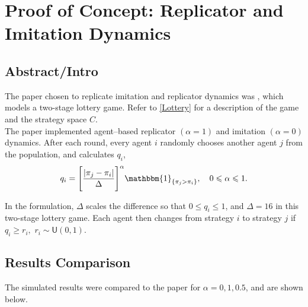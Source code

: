
\section{Proof of Concept: Replicator and Imitation Dynamics} \label{Lottery_Me}
\subsection{Abstract/Intro}
The paper chosen to replicate imitation and replicator dynamics was \cite{RN30}, which models a two-stage lottery game. Refer to \ref{Lottery} for a description of the game and the strategy space $C$. \\

The paper implemented agent--based replicator $(\alpha = 1)$ and imitation $(\alpha = 0)$ dynamics. After each round, every agent $i$ randomly chooses another agent $j$ from the population, and calculates $q_i$, \\

\begin{align} \label{rep}
q_i = \Bigg[ \frac{|\pi_j - \pi_i|}{\Delta} \Bigg]^\alpha \mathbbm{1}_{\{\pi_j>\pi_i\}}, \quad  0 \leq \alpha \leq 1.\end{align} 

In the formulation, $\Delta$ scales the difference so that $0 \leq q_i \leq 1$, and $\Delta = 16$ in this two-stage lottery game. Each agent then changes from strategy $i$ to strategy $j$ if $q_i \geq r_i,$ $r_i \sim \mathsf{U}(0,1)$. \\

\subsection{Results Comparison}
The simulated results were compared to the paper for $\alpha = 0, 1, 0.5$, and are shown below. \\

